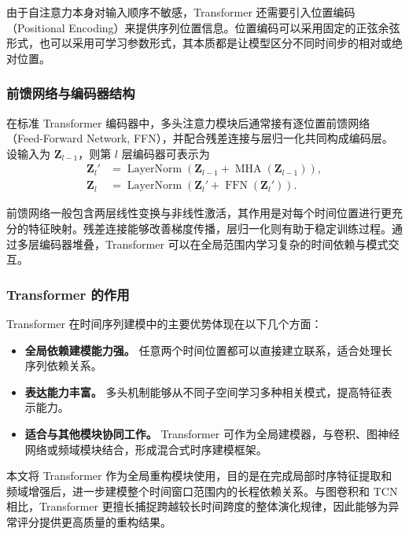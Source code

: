 \documentclass[bachelor, vlined]{DissertUESTC}
\begin{document}
    由于自注意力本身对输入顺序不敏感，Transformer 还需要引入位置编码（Positional Encoding）来提供序列位置信息。位置编码可以采用固定的正弦余弦形式，也可以采用可学习参数形式，其本质都是让模型区分不同时间步的相对或绝对位置。

    \subsubsection{前馈网络与编码器结构}

    在标准 Transformer 编码器中，多头注意力模块后通常接有逐位置前馈网络（Feed-Forward Network, FFN），并配合残差连接与层归一化共同构成编码层。设输入为 $\mathbf{Z}_{l-1}$，则第 $l$ 层编码器可表示为
    \begin{align}
        \mathbf{Z}_l' &= \operatorname{LayerNorm}\!\left(
            \mathbf{Z}_{l-1} + \operatorname{MHA}(\mathbf{Z}_{l-1})
        \right), \\
        \mathbf{Z}_l &= \operatorname{LayerNorm}\!\left(
            \mathbf{Z}_l' + \operatorname{FFN}(\mathbf{Z}_l')
        \right).
    \end{align}

    前馈网络一般包含两层线性变换与非线性激活，其作用是对每个时间位置进行更充分的特征映射。残差连接能够改善梯度传播，层归一化则有助于稳定训练过程。通过多层编码器堆叠，Transformer 可以在全局范围内学习复杂的时间依赖与模式交互。

    \subsubsection{Transformer 的作用}

    Transformer 在时间序列建模中的主要优势体现在以下几个方面：

    \begin{itemize}
        \item \textbf{全局依赖建模能力强。} 任意两个时间位置都可以直接建立联系，适合处理长序列依赖关系。
        \item \textbf{表达能力丰富。} 多头机制能够从不同子空间学习多种相关模式，提高特征表示能力。
        \item \textbf{适合与其他模块协同工作。} Transformer 可作为全局建模器，与卷积、图神经网络或频域模块结合，形成混合式时序建模框架。
    \end{itemize}

    本文将 Transformer 作为全局重构模块使用，目的是在完成局部时序特征提取和频域增强后，进一步建模整个时间窗口范围内的长程依赖关系。与图卷积和 TCN 相比，Transformer 更擅长捕捉跨越较长时间跨度的整体演化规律，因此能够为异常评分提供更高质量的重构结果。
\end{document}

